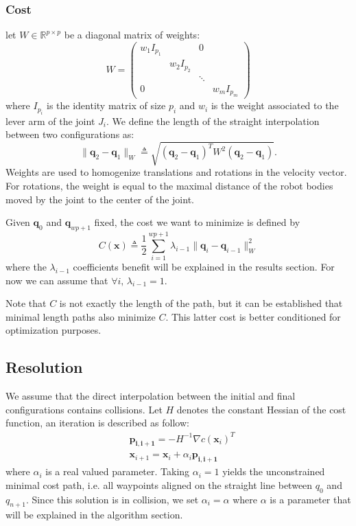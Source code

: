 \documentclass{tADR2e}
\newcommand\real{\mathbb{R}}
\newcommand\pii{\mathbf{p_{i,i+1}}}
\newcommand\conf{\mathbf{q}}
\newcommand\xx{\mathbf{x}}
\newcommand\cost{C}
\begin{document}
\subsubsection {Cost}

let $W\in\real^{p\times p}$ be a diagonal matrix of weights:
$$
W=\left(\begin{array}{cccccccccc}
w_1 I_{p_1}       &        &  0  \\
    & w_2 I_{p_2} &        &   \\
    &            & \ddots &   \\
  0 &            &        & w_m I_{p_m}
\end{array}\right)
$$
where $I_{p_i}$ is the identity matrix of size $p_i$ and $w_i$ is the weight 
associated to the lever arm of the joint $J_i$. We define the length of the straight interpolation 
between two configurations as:
$$
\|\conf_2 - \conf_1\|_{W} \triangleq \sqrt{(\conf_2 - \conf_1)^T W^2 (\conf_2 - 
\conf_1)}.
$$
Weights are used to homogenize translations and rotations in the velocity vector. 
For rotations, the weight is equal to the maximal distance of the robot bodies 
moved by the joint to the center of the joint.

Given $\conf_0$ and $\conf_{wp+1}$ fixed, the cost we want to minimize is defined 
by
$$
\cost (\xx) \triangleq \frac{1}{2}\sum_{i=1}^{wp+1} \lambda_{i-1} \|\conf_{i}-\conf_{i-1}\|_{W}
^{2}
$$
where the $\lambda_{i-1}$ coefficients benefit will be explained in the results 
section. For now we can assume that $\forall i,\, \lambda_{i-1}=1$.

Note that $\cost$ is not exactly the length of the path, but it can be 
established that minimal length paths also minimize $\cost$. This latter cost is 
better conditioned for optimization purposes.

\subsection {Resolution}
We assume that the direct interpolation between the initial and final configurations contains collisions.
Let $H$ denotes the constant Hessian of the cost function, an iteration is 
described as follow:
\begin{equation}\label{eq:iteration-1}
\begin{split}
& \pii =  -H^{-1} \nabla c(\xx_i)^{T} \\
& \xx_{i+1} =  \xx_{i} + \alpha_i \pii
\end{split} 
\end{equation}
where $\alpha_i$ is a real valued parameter. Taking $\alpha_i=1$ yields the 
unconstrained minimal cost path, i.e. all waypoints aligned on the straight line 
between $q_0$ and $q_{n+1}$. Since this solution is in collision, we set 
$\alpha_i = \alpha$ 
where $\alpha$ is a parameter that will be explained in the algorithm section.
\end{document}
